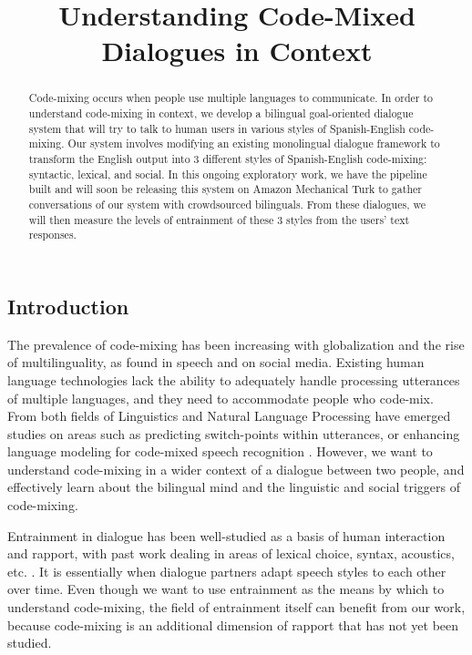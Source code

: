 \documentclass[12pt, letterpaper]{article}
\title{\vspace{-6ex}Understanding Code-Mixed Dialogues in Context\vspace{-4ex}}
\date{}
\begin{document}
\maketitle
\begin{multicols*}{2}
\setlength{\parindent}{15pt}

\begin{abstract}
\normalsize
Code-mixing occurs when people use multiple languages to communicate. In order to understand code-mixing in context, we develop a bilingual goal-oriented dialogue system that will try to talk to human users in various styles of Spanish-English code-mixing. Our system involves modifying an existing monolingual dialogue framework to transform the English output into 3 different styles of Spanish-English code-mixing: syntactic, lexical, and social. In this ongoing exploratory work, we have the pipeline built and will soon be releasing this system on Amazon Mechanical Turk to gather conversations of our system with crowdsourced bilinguals. From these dialogues, we will then measure the levels of entrainment of these 3 styles from the users’ text responses.
\end{abstract}

\normalsize
\section{Introduction} 
The prevalence of code-mixing has been increasing with globalization and the rise of multilinguality, as found in speech and on social media. Existing human language technologies lack the ability to adequately handle processing utterances of multiple languages, and they need to accommodate people who code-mix. From both fields of Linguistics and Natural Language Processing have emerged studies on areas such as predicting switch-points within utterances, or enhancing language modeling for code-mixed speech recognition \citep{Solorio2008,Li2014}. However, we want to understand code-mixing in a wider context of a dialogue between two people, and effectively learn about the bilingual mind and the linguistic and social triggers of code-mixing.

Entrainment in dialogue has been well-studied as a basis of human interaction and rapport, with past work dealing in areas of lexical choice, syntax, acoustics, etc. \citep{Levitan2013}. It is essentially when dialogue partners adapt speech styles to each other over time. Even though we want to use entrainment as the means by which to understand code-mixing, the field of entrainment itself can benefit from our work, because code-mixing is an additional dimension of rapport that has not yet been studied.


\end{multicols*}
\end{document}
